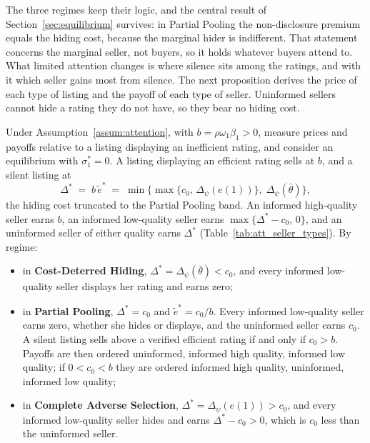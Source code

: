 The three regimes keep their logic, and the central result of Section~\ref{sec:equilibrium} survives: in Partial Pooling the non-disclosure premium equals the hiding cost, because the marginal hider is indifferent. That statement concerns the marginal seller, not buyers, so it holds whatever buyers attend to. What limited attention changes is where silence sits among the ratings, and with it which seller gains most from silence. The next proposition derives the price of each type of listing and the payoff of each type of seller. Uninformed sellers cannot hide a rating they do not have, so they bear no hiding cost.

\begin{proposition}
\label{prop:att_seller_types}
Under Assumption~\ref{assum:attention}, with $b=\rho\omega_1\beta_1>0$, measure prices and payoffs relative to a listing displaying an inefficient rating, and consider an equilibrium with $\sigma_1^*=0$. A listing displaying an efficient rating sells at $b$, and a silent listing at
\begin{equation}
    \Delta^*\;=\;b\,\tilde e^*\;=\;\min\Big\{\max\big\{c_0,\,\Delta_\psi(e(1))\big\},\;\Delta_\psi(\bar\theta)\Big\},
    \label{eq:att_premium_trunc}
\end{equation}
the hiding cost truncated to the Partial Pooling band. An informed high-quality seller earns $b$, an informed low-quality seller earns $\max\{\Delta^*-c_0,\,0\}$, and an uninformed seller of either quality earns $\Delta^*$ (Table~\ref{tab:att_seller_types}). By regime:
\begin{itemize}
    \item in \textbf{Cost-Deterred Hiding}, $\Delta^*=\Delta_\psi(\bar\theta)<c_0$, and every informed low-quality seller displays her rating and earns zero;
    \item in \textbf{Partial Pooling}, $\Delta^*=c_0$ and $\tilde e^*=c_0/b$. Every informed low-quality seller earns zero, whether she hides or displays, and the uninformed seller earns $c_0$. A silent listing sells above a verified efficient rating if and only if $c_0>b$. Payoffs are then ordered uninformed, informed high quality, informed low quality; if $0<c_0<b$ they are ordered informed high quality, uninformed, informed low quality;
    \item in \textbf{Complete Adverse Selection}, $\Delta^*=\Delta_\psi(e(1))>c_0$, and every informed low-quality seller hides and earns $\Delta^*-c_0>0$, which is $c_0$ less than the uninformed seller.

\end{itemize}
\end{proposition}
